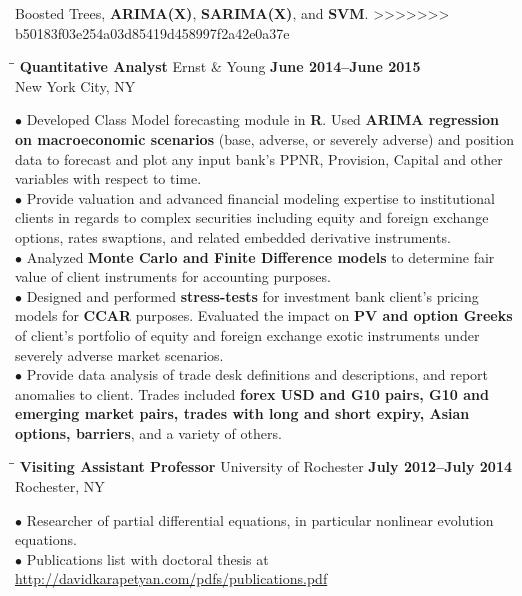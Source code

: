 \documentclass{resume}
\begin{document}
\begin{resume}
Boosted Trees, \textbf{ARIMA(X)}, \textbf{SARIMA(X)}, and \textbf{SVM}. 
>>>>>>> b50183f03e254a03d85419d458997f2a42e0a37e
\begin{tabbing}
\hspace{2.3in}\= \hspace{2.6in}\= \kill
{\bf Quantitative Analyst} \> Ernst \& Young   
\>\textbf{June 2014--June 2015 } \\
    \>New York City, NY 
\end{tabbing}
$\bullet$
Developed Class Model forecasting module in \textbf{R}. Used
\textbf{ARIMA regression \\ on macroeconomic scenarios} (base, adverse, or severely adverse) and position data to forecast and plot any input bank’s PPNR,
Provision, Capital and other variables with respect to time.  \\
$\bullet$ Provide valuation and advanced financial modeling expertise to
institutional clients in regards to complex securities including equity and
foreign exchange options, rates swaptions, and related embedded derivative
instruments.  \\
$\bullet$ 
Analyzed \textbf{Monte Carlo and Finite Difference models} to determine fair value of
client instruments for accounting purposes.  \\
$\bullet$ Designed and performed \textbf{stress-tests} for investment bank
client’s pricing models for \textbf{CCAR} purposes. Evaluated the impact on
\textbf{PV and option Greeks} of client’s portfolio of equity and foreign exchange exotic instruments under severely adverse market scenarios. 
\\
$\bullet$
Provide data analysis of trade desk definitions and descriptions, and report
anomalies to client. Trades included \textbf{forex USD and G10 pairs, G10 and
	emerging market pairs, trades with long and short expiry, Asian options,
barriers}, and a variety of others.
\begin{tabbing}
\hspace{2.3in}\= \hspace{2.6in}\= \kill
{\bf Visiting Assistant Professor} \>University of Rochester     
\>\textbf{July 2012--July 2014} \\
    \>Rochester, NY 
\end{tabbing}
$\bullet$ Researcher of partial differential equations, in particular nonlinear evolution equations.  
\\
$\bullet$ Publications list with doctoral thesis at \url{http://davidkarapetyan.com/pdfs/publications.pdf}
\\

\end{resume}
\end{document}
